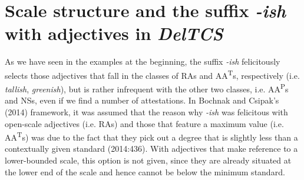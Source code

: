 \documentclass[output=paper
,modfonts
,nonflat]{langsci/langscibook}
\begin{document}
\section{Scale structure and the suffix \textit{-ish} with adjectives in \textit{DelTCS}}
\label{scale-ish-deltcs}

As we have seen in the examples at the beginning, the suffix \textit{-ish} felicitously selects those adjectives that fall in the classes of RAs and AA\textsuperscript{T}s, respectively (i.e. \textit{tallish}, \textit{greenish}), but is rather infrequent with the other two classes, i.e. AA\textsuperscript{P}s and NSs, even if we find a number of attestations.
In Bochnak and Csipak's (2014) framework, it was assumed that the reason why \textit{-ish} was felicitous with open-scale adjectives (i.e. RAs) and those that feature a maximum value (i.e. AA\textsuperscript{T}s) was due to the fact that they pick out a degree that is slightly less than a contextually given standard (2014:436). With adjectives that make reference to a lower-bounded scale, this option is not given, since they are already situated at the lower end of the scale and hence cannot be below the minimum standard.
\end{document}
